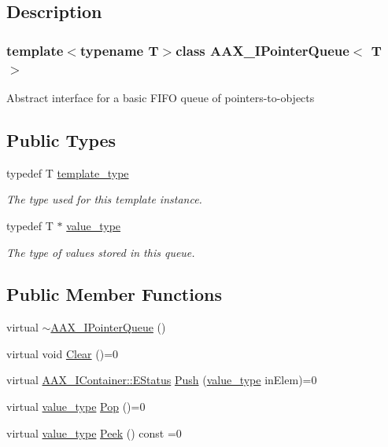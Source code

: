 \subsection{Description}
\subsubsection*{template$<$typename T$>$class A\+A\+X\+\_\+\+I\+Pointer\+Queue$<$ T $>$}

Abstract interface for a basic F\+I\+F\+O queue of pointers-\/to-\/objects \subsection*{Public Types}
\begin{DoxyCompactItemize}
\item 
typedef T \hyperlink{a00110_ae37a600f078ca0ee6f24b9f45aadc254}{template\+\_\+type}
\begin{DoxyCompactList}\small\item\em The type used for this template instance. \end{DoxyCompactList}\item 
typedef T $\ast$ \hyperlink{a00110_a2d28a2dffe8dc2b7fe218c41b46734e9}{value\+\_\+type}
\begin{DoxyCompactList}\small\item\em The type of values stored in this queue. \end{DoxyCompactList}\end{DoxyCompactItemize}
\subsection*{Public Member Functions}
\begin{DoxyCompactItemize}
\item 
virtual \hyperlink{a00110_a6e5e9c6bc4f527d35506236dd41a093a}{$\sim$\+A\+A\+X\+\_\+\+I\+Pointer\+Queue} ()
\item 
virtual void \hyperlink{a00110_a42bdf5794a2481d0ae3f294fd8f8203e}{Clear} ()=0
\item 
virtual \hyperlink{a00089_aea020100f0b06636ce7cb25c2fdb0af7}{A\+A\+X\+\_\+\+I\+Container\+::\+E\+Status} \hyperlink{a00110_a6f8185d83cac520021bbca7054c57d38}{Push} (\hyperlink{a00110_a2d28a2dffe8dc2b7fe218c41b46734e9}{value\+\_\+type} in\+Elem)=0
\item 
virtual \hyperlink{a00110_a2d28a2dffe8dc2b7fe218c41b46734e9}{value\+\_\+type} \hyperlink{a00110_a49990f21819f0f4493183ea0770d4125}{Pop} ()=0
\item 
virtual \hyperlink{a00110_a2d28a2dffe8dc2b7fe218c41b46734e9}{value\+\_\+type} \hyperlink{a00110_a005cd2626fb8db4d5d708f255b48a0be}{Peek} () const =0
\end{DoxyCompactItemize}


